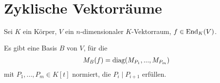 \section{Zyklische Vektorräume}

Sei $K$ ein Körper, $V$ ein $n$-dimensionaler $K$-Vektorraum, $f\in\operatorname{End}_K(V)$.

\begin{conclusion}
	Es gibt eine Basis $B$ von $V$, für die 
	\begin{align}
		M_B(f)=\operatorname{diag}(M_{P_1},...,M_{P_m})\notag
	\end{align}
	mit $P_1,...,P_m\in K[t]$ normiert, die $P_i\mid P_{i+1}$ erfüllen.
\end{conclusion}